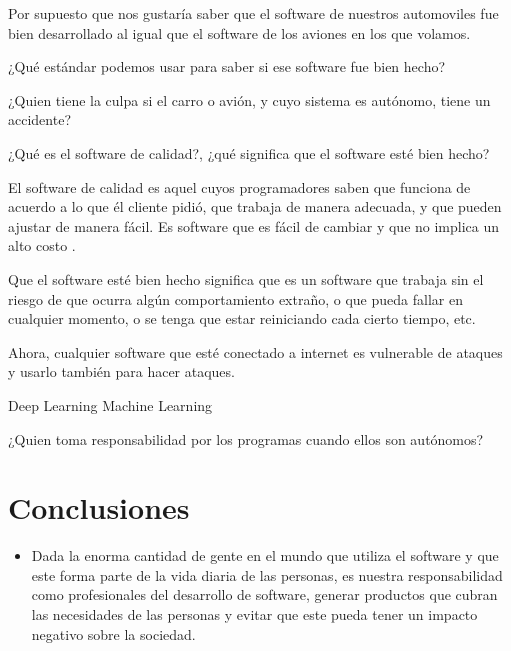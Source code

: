 \documentclass[twoside]{article}
\begin{document}
\begin{multicols}{2}
Por supuesto que nos gustaría saber que el software de nuestros automoviles fue
bien desarrollado al igual que el software de los aviones en los que volamos.

¿Qué estándar podemos usar para saber si ese software fue bien hecho?

¿Quien tiene la culpa si el carro o avión, y cuyo sistema es autónomo, tiene un
accidente?

¿Qué es el software de calidad?, ¿qué significa que el software esté bien hecho?

El software de calidad es aquel cuyos programadores saben que funciona de
acuerdo a lo que él cliente pidió, que trabaja de manera adecuada, y que pueden
ajustar de manera fácil. Es software que es fácil de cambiar y que no implica un
alto costo \cite{CMartin2022EthicsManifesto}.

Que el software esté bien hecho significa que es un software que trabaja sin el
riesgo de que ocurra algún comportamiento extraño, o que pueda fallar en
cualquier momento, o se tenga que estar reiniciando cada cierto tiempo, etc.

Ahora, cualquier software que esté conectado a internet es vulnerable de ataques
y usarlo también para hacer ataques.

Deep Learning
Machine Learning

¿Quien toma responsabilidad por los programas cuando ellos son autónomos?


\section{Conclusiones}

\begin{itemize}
\item Dada la enorma cantidad de gente en el mundo que utiliza el software y
que este forma parte de la vida diaria de las personas, es nuestra
responsabilidad como profesionales del desarrollo de software, generar productos
que cubran las necesidades de las personas y evitar que este pueda tener un
impacto negativo sobre la sociedad.

\end{itemize}


\pagebreak
 


\end{multicols}
\end{document}

